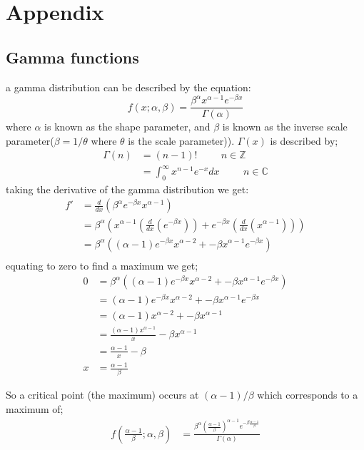 \chapter{Appendix}
\section{Gamma functions}
a gamma distribution can be described by the equation: 
\begin{equation}
	f(x;\alpha,\beta)  = \frac{\beta^\alpha x^{\alpha-1} e^{-\beta x}}{\Gamma (\alpha)}
\end{equation}
where $\alpha$ is known as the shape parameter, and $\beta$ is known as the inverse scale parameter($\beta = 1/\theta$ where $\theta$ is the scale parameter)). $\Gamma(x)$ is described by;
\begin{align}
	\Gamma(n) &= (n-1)! \hspace{1cm} n\in \mathds{Z} \\
	&= \int_{0}^{\infty}x^{n-1} e^{-x} dx\hspace{1cm}   n\in \mathds{C}
\end{align}
taking the derivative of the gamma distribution we get:
\begin{align}
	f' & = \frac{d}{dx}\left(\beta^\alpha e^{-\beta x}x^{\alpha-1} \right) \\
	& =\beta^\alpha \left( x^{\alpha -1} \left(\frac{d}{dx}\left( e^{-\beta x} \right) \right) + e^{-\beta x }\left( \frac{d}{dx}\left( x^{\alpha -1} \right) \right) \right)\\
	& = \beta^\alpha \left( 	(\alpha -1 ) e^{-\beta x} x^{\alpha -2} + -\beta x^{\alpha -1}e^{-\beta x}    	\right) \\
\end{align}
equating to zero to find a maximum we get;
\begin{align}
	0 &= \beta^\alpha \left( 	(\alpha -1 ) e^{-\beta x} x^{\alpha -2} + -\beta x^{\alpha -1}e^{-\beta x}   \right) \\
	&=  (\alpha -1 ) e^{-\beta x} x^{\alpha -2} + -\beta x^{\alpha -1}e^{-\beta x} \\
	&=  (\alpha -1 ) x^{\alpha -2} + -\beta x^{\alpha -1} \\
	&= \frac{(\alpha -1 )x^{\alpha-1}}{x} - \beta x^{\alpha -1} \\
	&= \frac{\alpha  -1}{x} - \beta \\
	x & = \frac{\alpha -1}{\beta}
\end{align}


So a critical point (the maximum) occurs at $(\alpha -1)/\beta$ which corresponds to a maximum of;
\begin{align}
f\left( \frac{\alpha-1}{\beta};\alpha,\beta \right) & = \frac{\beta^\alpha \left( \frac{\alpha-1}{\beta}\right)^{\alpha -1} e^{-\beta \frac{\alpha-1}{\beta}}}{\Gamma(\alpha)}\\
\end{align}

